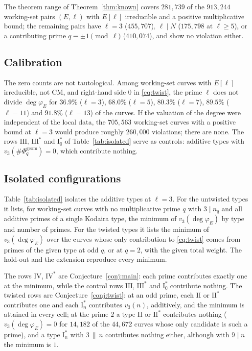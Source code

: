 \documentclass[11pt]{amsart}
\theoremstyle{definition}
\newcommand{\degphi}{\deg\varphi_E}
\newcommand{\Phig}{\Phi^{\mathrm{geom}}}
\begin{document}
The theorem range of Theorem~\ref{thm:known} covers $281{,}739$ of the $913{,}244$ working-set pairs $(E,\ell)$ with $E[\ell]$ irreducible and a positive multiplicative bound; the remaining pairs have $\ell=3$ ($455{,}707$), $\ell\mid N$ ($175{,}798$ at $\ell\ge5$), or a contributing prime $q\equiv\pm1\pmod\ell$ ($410{,}074$), and show no violation either.

\subsection{Calibration}
The zero counts are not tautological. Among working-set curves with $E[\ell]$ irreducible, not CM, and right-hand side $0$ in \eqref{eq:twist}, the prime $\ell$ does not divide $\degphi$ for $36.9\%$ ($\ell=3$), $68.0\%$ ($\ell=5$), $80.3\%$ ($\ell=7$), $89.5\%$ ($\ell=11$) and $91.8\%$ ($\ell=13$) of the curves. If the valuation of the degree were independent of the local data, the $705{,}563$ working-set curves with a positive bound at $\ell=3$ would produce roughly $260{,}000$ violations; there are none. The rows $\mathrm{III}$, $\mathrm{III}^*$ and $\mathrm{I}_0^*$ of Table~\ref{tab:isolated} serve as controls: additive types with $v_3(\#\Phig_q)=0$, which contribute nothing.

\subsection{Isolated configurations}
Table~\ref{tab:isolated} isolates the additive types at $\ell=3$. For the untwisted types it lists, for working-set curves with no multiplicative prime $q$ with $3\mid n_q$ and all additive primes of a single Kodaira type, the minimum of $v_3(\degphi)$ by type and number of primes. For the twisted types it lists the minimum of $v_3(\degphi)$ over the curves whose only contribution to \eqref{eq:twist} comes from primes of the given type at odd $q$, or at $q=2$, with the given total weight. The hold-out and the extension reproduce every minimum.

\begin{table}[ht]
\centering\small

\caption{Minimum of $v_3(\degphi)$ (number of curves) over working-set curves with $E[3]$ irreducible whose only possible contributions at $3$ come from the primes named in the row, with the given number of primes (untwisted rows) or total weight (twisted rows).}\label{tab:isolated}
\end{table}

The rows $\mathrm{IV}$, $\mathrm{IV}^*$ are Conjecture~\ref{conj:main}: each prime contributes exactly one at the minimum, while the control rows $\mathrm{III}$, $\mathrm{III}^*$ and $\mathrm{I}_0^*$ contribute nothing. The twisted rows are Conjecture~\ref{conj:twist}: at an odd prime, each $\mathrm{II}$ or $\mathrm{II}^*$ contributes one and each $\mathrm{I}_n^*$ contributes $v_3(n)$, additively, and the minimum is attained in every cell; at the prime $2$ a type $\mathrm{II}$ or $\mathrm{II}^*$ contributes nothing ($v_3(\degphi)=0$ for $14{,}182$ of the $44{,}672$ curves whose only candidate is such a prime), and a type $\mathrm{I}_n^*$ with $3\,\|\,n$ contributes nothing either, although with $9\mid n$ the minimum is $1$.
\end{document}
